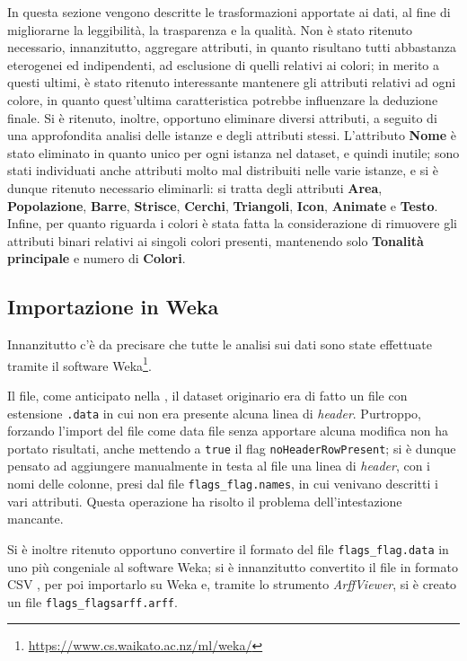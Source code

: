 \documentclass[a4paper,11pt,twoside,notitlepage,final]{scrartcl}
\begin{document}
In questa sezione vengono descritte le trasformazioni apportate ai dati, al fine di migliorarne la leggibilità, la trasparenza e la qualità.
Non è stato ritenuto necessario, innanzitutto, aggregare attributi, in quanto risultano tutti abbastanza eterogenei ed indipendenti, ad esclusione di quelli relativi ai colori;
in merito a questi ultimi, è stato ritenuto interessante mantenere gli attributi relativi ad ogni colore, in quanto quest'ultima caratteristica potrebbe influenzare la deduzione finale.
Si è ritenuto, inoltre, opportuno eliminare diversi attributi, a seguito di una approfondita analisi delle istanze e degli attributi stessi.
L'attributo \textbf{Nome} è stato eliminato in quanto unico per ogni istanza nel dataset, e quindi inutile; sono stati individuati anche attributi molto mal distribuiti nelle varie istanze,
e si è dunque ritenuto necessario eliminarli: si tratta degli attributi \textbf{Area}, \textbf{Popolazione}, \textbf{Barre}, \textbf{Strisce}, \textbf{Cerchi}, \textbf{Triangoli}, \textbf{Icon}, \textbf{Animate} e \textbf{Testo}.
Infine, per quanto riguarda i colori è stata fatta la considerazione di rimuovere gli attributi binari relativi ai singoli colori presenti, mantenendo solo \textbf{Tonalità principale} e numero di \textbf{Colori}.

\subsection{Importazione in Weka}

Innanzitutto c'è da precisare che tutte le analisi sui dati sono state effettuate tramite il software Weka\footnote{\url{https://www.cs.waikato.ac.nz/ml/weka/}}.

Il file, come anticipato nella , il dataset originario era di fatto un file con estensione \texttt{.data} in cui non era presente alcuna linea di \emph{header}.
Purtroppo, forzando l'import del file come data file senza apportare alcuna modifica non ha portato risultati, anche mettendo a \texttt{true} il flag \texttt{noHeaderRowPresent};
si è dunque pensato ad aggiungere manualmente in testa al file una linea di \emph{header}, con i nomi delle colonne, presi dal file \texttt{flags\_flag.names}, in cui venivano descritti i vari attributi.
Questa operazione ha risolto il problema dell'intestazione mancante.

Si è inoltre ritenuto opportuno convertire il formato del file \texttt{flags\_flag.data} in uno più congeniale al software Weka; si è innanzitutto convertito il file in formato CSV
, per poi importarlo su Weka e, tramite lo strumento \emph{ArffViewer}, si è creato un file \texttt{flags\_flagsarff.arff}.
\end{document}
